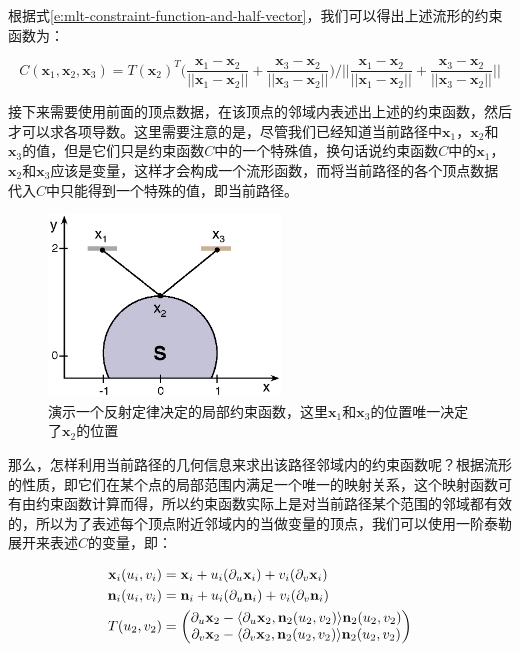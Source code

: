 \noindent 根据式\ref{e:mlt-constraint-function-and-half-vector}，我们可以得出上述流形的约束函数为：

\begin{equation}\label{e:mlt-example-c}
	C(\mathbf{x}_1,\mathbf{x}_2,\mathbf{x}_3)=T(\mathbf{x}_2)^{T}\Biggl(\frac{\mathbf{x}_1-\mathbf{x}_2}{||\mathbf{x}_1-\mathbf{x}_2||}+\frac{\mathbf{x}_3-\mathbf{x}_2}{||\mathbf{x}_3-\mathbf{x}_2||}\Biggl) \Biggl/
		\Biggl|\Biggl|\frac{\mathbf{x}_1-\mathbf{x}_2}{||\mathbf{x}_1-\mathbf{x}_2||}+\frac{\mathbf{x}_3-\mathbf{x}_2}{||\mathbf{x}_3-\mathbf{x}_2||}\Biggl|\Biggl|
\end{equation}

接下来需要使用前面的顶点数据，在该顶点的邻域内表述出上述的约束函数，然后才可以求各项导数。这里需要注意的是，尽管我们已经知道当前路径中$\mathbf{x}_1$，$\mathbf{x}_2$和$\mathbf{x}_3$的值，但是它们只是约束函数$C$中的一个特殊值，换句话说约束函数$C$中的$\mathbf{x}_1$，$\mathbf{x}_2$和$\mathbf{x}_3$应该是变量，这样才会构成一个流形函数，而将当前路径的各个顶点数据代入$C$中只能得到一个特殊的值，即当前路径。

\begin{figure}
	\sidecaption
	\includegraphics[width=0.55\textwidth]{figures/mlt/example}
	\caption{演示一个反射定律决定的局部约束函数，这里$\mathbf{x}_1$和$\mathbf{x}_3$的位置唯一决定了$\mathbf{x}_2$的位置}
	\label{f:mlt-example}
\end{figure}

那么，怎样利用当前路径的几何信息来求出该路径邻域内的约束函数呢？根据流形的性质，即它们在某个点的局部范围内满足一个唯一的映射关系，这个映射函数可有由约束函数计算而得，所以约束函数实际上是对当前路径某个范围的邻域都有效的，所以为了表述每个顶点附近邻域内的当做变量的顶点，我们可以使用一阶泰勒展开来表述$C$的变量，即：

\begin{equation}
\begin{aligned}
	\mathbf{x}_i(u_i,v_i)&=\mathbf{x}_i+u_i({\rm \partial}_u\mathbf{x}_i)+v_i({\rm \partial}_v\mathbf{x}_i)\\
	\mathbf{n}_i(u_i,v_i)&=\mathbf{n}_i+u_i({\rm \partial}_u\mathbf{n}_i)+v_i({\rm \partial}_v\mathbf{n}_i)\\
	T(u_2,v_2)&=\begin{pmatrix}
		{\rm \partial}_u\mathbf{x}_2-\langle{\rm \partial}_u\mathbf{x}_2,\mathbf{n}_2(u_2,v_2)\rangle\mathbf{n}_2(u_2,v_2)\\
		{\rm \partial}_v\mathbf{x}_2-\langle{\rm \partial}_v\mathbf{x}_2,\mathbf{n}_2(u_2,v_2)\rangle\mathbf{n}_2(u_2,v_2)
	\end{pmatrix}
\end{aligned}
\end{equation}

